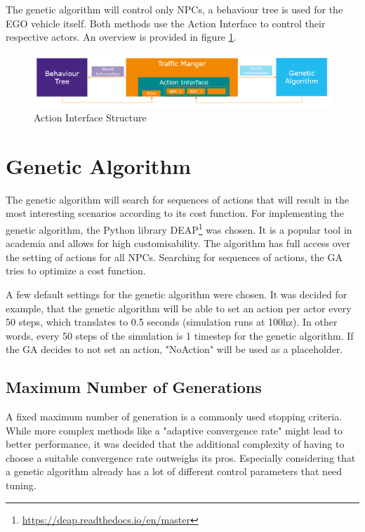 The genetic algorithm will control only NPCs, a behaviour tree is used for the EGO vehicle itself. Both methods use the Action Interface to control their respective actors. An overview is provided in figure \ref{figure:traffic_manager:structure}.

\begin{figure}[ht] 
	\includegraphics[width=1\linewidth]{figures/tm_structure}
	\caption{Action Interface Structure}
	\label{figure:traffic_manager:structure}
\end{figure}

\section{Genetic Algorithm}
The genetic algorithm will search for sequences of actions that will result in the most interesting scenarios according to its cost function.
For implementing the genetic algorithm, the Python library DEAP\footnote{\url{https://deap.readthedocs.io/en/master}} was chosen. It is a popular tool in academia and allows for high customisability.
The algorithm has full access over the setting of actions for all NPCs. Searching for sequences of actions, the GA tries to optimize a cost function.

A few default settings for the genetic algorithm were chosen. It was decided for example, that the genetic algorithm will be able to set an action per actor every 50 steps, which translates to 0.5 seconds (simulation runs at 100hz). In other words, every 50 steps of the simulation is 1 timestep for the genetic algorithm. If the GA decides to not set an action, "NoAction" will be used as a placeholder.

\subsection{Maximum Number of Generations}
A fixed maximum number of generation is a commonly used stopping criteria. While more complex methods like a "adaptive convergence rate" might lead to better performance, it was decided that the additional complexity of having to choose a suitable convergence rate outweighs its pros. Especially considering that a genetic algorithm already has a lot of different control parameters that need tuning.

